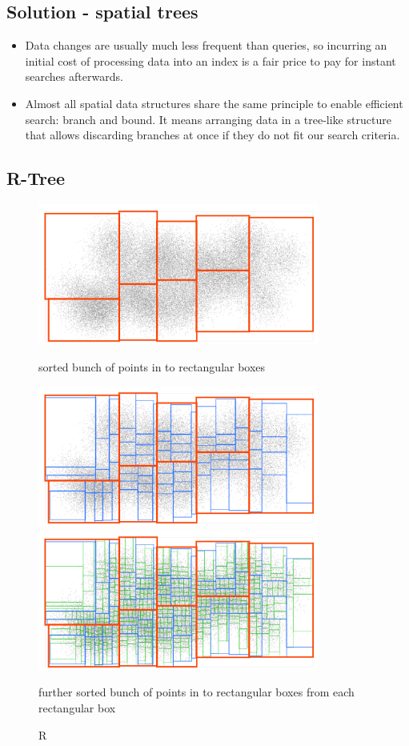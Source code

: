 \documentclass[paper=letter, fontsize=12pt]{article}
\begin{document}
\subsection{Solution - spatial trees}
\begin{itemize}
	\item Data changes are usually much less frequent than queries, so incurring an initial cost of processing data into an index is a fair price to pay for instant searches afterwards.
	\item Almost all spatial data structures share the same principle to enable efficient search: branch and bound. It means arranging data in a tree-like structure that allows discarding branches at once if they do not fit our search criteria.
\end{itemize}

\subsection{R-Tree}
\begin{figure}[htbp]
	\centering
	\includegraphics[width=350px]{assets/rtree1}
	\caption{sorted bunch of points in to rectangular boxes}
	\includegraphics[width=350px]{assets/rtree2}
	\includegraphics[width=350px]{assets/rtree3}
	\caption{further sorted bunch of points in to rectangular boxes from each rectangular box}
	\caption{R}
\end{figure}
\end{document}
